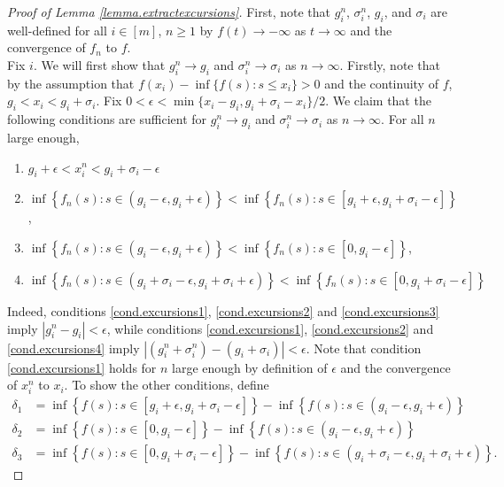 \begin{proof}[Proof of Lemma \ref{lemma.extractexcursions}]
First, note that $g_i^n$, $\sigma_i^n$, $g_i$, and $\sigma_i$ are well-defined for all $i\in [m]$, $n\geq 1$ by $f(t)\to -\infty$ as $t\to \infty$ and the convergence of $f_n$ to $f$. \\
Fix $i$. We will first show that $g^n_i\to g_i$ and $\sigma_i^n\to \sigma_i$ as $n\to \infty$. Firstly, note that by the assumption that $f(x_i)-\inf\{f(s):s\leq x_i\}>0$ and the continuity of $f$, $g_i<x_i<g_i+\sigma_i$. Fix $0<\epsilon<\min\{x_i-g_i,g_i+\sigma_i-x_i\}/2$. We claim that the following conditions are sufficient for $g^n_i\to g_i$ and $\sigma_i^n\to \sigma_i$ as $n\to \infty$. For all $n$ large enough,
\begin{enumerate}
    \item \label{cond.excursions1} $g_i+\epsilon<x^n_i<g_i+\sigma_i-\epsilon$
    \item \label{cond.excursions2}$\inf\left\{f_n(s):s\in (g_i-\epsilon, g_i+\epsilon)\right\}<\inf\left\{f_n(s):s\in [g_i+\epsilon,g_i+\sigma_i-\epsilon] \right\}$, 
    \item \label{cond.excursions3}$\inf\left\{f_n(s):s\in (g_i-\epsilon, g_i+\epsilon)\right\}<\inf\left\{f_n(s):s\in [0,g_i-\epsilon]\right\}$,
    \item \label{cond.excursions4} $\inf\left\{ f_n(s):s\in (g_i+\sigma_i-\epsilon,g_i+\sigma_i+\epsilon)\right\}<\inf\left\{f_n(s):s\in [0,g_i+\sigma_i-\epsilon]\right\}$
\end{enumerate}
Indeed, conditions \ref{cond.excursions1}, \ref{cond.excursions2} and \ref{cond.excursions3} imply $|g^n_i-g_i|<\epsilon$, while conditions \ref{cond.excursions1}, \ref{cond.excursions2} and \ref{cond.excursions4} imply $|(g^n_i+\sigma^n_i)-(g_i+\sigma_i)|<\epsilon$. Note that condition \ref{cond.excursions1} holds for $n$ large enough by definition of $\epsilon$ and the convergence of $x_i^n$ to $x_i$. To show the other conditions, define
\begin{align*}\delta_1&=\inf\left\{f(s):s\in [g_i+\epsilon,g_i+\sigma_i-\epsilon]\right\}-\inf\left\{f(s):s\in (g_i-\epsilon,g_i+\epsilon)\right\}\\
\delta_2&=\inf\left\{f(s):s\in [0,g_i-\epsilon]\right\}-\inf\left\{f(s):s\in (g_i-\epsilon,g_i+\epsilon)\right\}\\
\delta_3&=\inf\left\{f(s):s\in [0,g_i+\sigma_i-\epsilon]\right\}-\inf\left\{f(s):s\in (g_i+\sigma_i-\epsilon,g_i+\sigma_i+\epsilon)\right\}.
\end{align*}

\end{proof}
